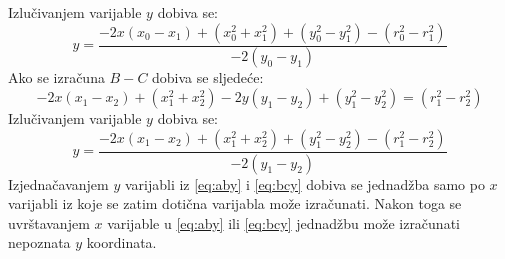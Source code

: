 Izlučivanjem varijable $y$ dobiva se:
\begin{equation}
\label{eq:aby}
    y = \frac{-2x(x_0 - x_1) + (x_0^2+x_1^2) + (y_0^2 - y_1^2) - (r_0^2 - r_1^2)}{-2(y_0 - y_1)}
\end{equation}
Ako se izračuna $B-C$ dobiva se sljedeće:
\begin{equation}
    -2x(x_1 - x_2) + (x_1^2+x_2^2) - 2y(y_1 - y_2) + (y_1^2 - y_2^2) = (r_1^2 - r_2^2)
\end{equation}
Izlučivanjem varijable $y$ dobiva se:
\begin{equation}
\label{eq:bcy}
    y = \frac{-2x(x_1 - x_2) + (x_1^2+x_2^2) + (y_1^2 - y_2^2) - (r_1^2 - r_2^2)}{-2(y_1 - y_2)}
\end{equation}
Izjednačavanjem $y$ varijabli iz \eqref{eq:aby} i \eqref{eq:bcy} dobiva se jednadžba samo po $x$ varijabli iz koje se zatim dotična varijabla može izračunati. 
Nakon toga se uvrštavanjem $x$ varijable u \eqref{eq:aby} ili \eqref{eq:bcy} jednadžbu može izračunati nepoznata $y$ koordinata.





